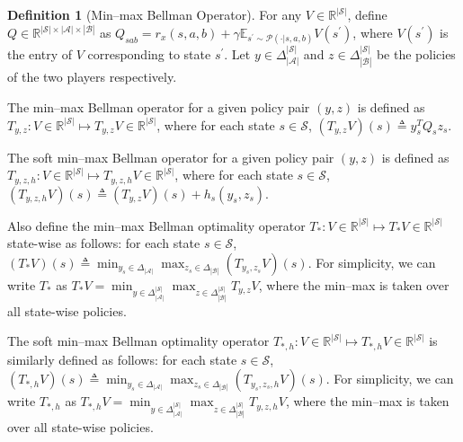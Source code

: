 \documentclass{article}
\theoremstyle{plain}
\theoremstyle{definition}
\newtheorem{definition}{Definition}
\theoremstyle{remark}
\def\R{\mathbb R}
\def\cA{\mathcal A}
\def\cB{\mathcal B}
\def\cP{\mathcal P}
\def\cS{\mathcal S}
\def\bydef{\triangleq}
\begin{document}
\begin{definition}[Min--max Bellman Operator]
    \label{definition: min-max-bellman-operator}
    For any $V \in \mathbb{R}^{|\mathcal{S}|}$, define $Q \in \mathbb{R}^{|\mathcal{S}| \times |\mathcal{A}| \times |\mathcal{B}|}$ as $Q_{sab} = r_x(s,a,b) + \gamma \mathbb{E}_{s^\prime \sim \cP(\cdot|s,a,b)} V(s^\prime)$, where $V(s^\prime)$ is the entry of $V$ corresponding to state $s^\prime$. Let $y \in \Delta^{|\cS|}_{|\cA|}$ and $z \in \Delta^{|\cS|}_{|\cB|}$ be the policies of the two players respectively.

    The min--max Bellman operator for a given policy pair $(y,z)$ is defined as
    $T_{y,z}: V \in \mathbb{R}^{|\mathcal{S}|} \mapsto T_{y,z} V \in \mathbb{R}^{|\mathcal{S}|}$,
    where for each state $s\in \mathcal{S}$,
    $(T_{y,z} V)(s) \bydef y_s^T Q_s z_s.$

    The soft min--max Bellman operator for a given policy pair $(y,z)$ is defined as
    $T_{y,z,h}: V \in \mathbb{R}^{|\mathcal{S}|} \mapsto  T_{y,z,h} V \in \mathbb{R}^{|\mathcal{S}|}$,
    where for each state $s\in \mathcal{S}$,
    $\left(T_{y,z,h} V\right)(s)  \bydef \left(T_{y,z} V\right)(s) + h_s(y_s,z_s).$

    Also define the min--max Bellman optimality operator $ T_{*}: V \in \mathbb{R}^{|\mathcal{S}|} \mapsto T_{*} V \in \R^{|\cS|}$ state-wise as follows: for each state $s\in \mathcal{S}$,
    $\left(T_{*} V\right)(s) \bydef \min_{y_s \in \Delta_{|\cA|}} \max_{z_s \in \Delta_{|\cB|}} \left(T_{y_s,z_s} V\right)(s).$ For simplicity, we can write $T_{*}$ as $T_{*} V = \min_{y \in \Delta_{|\cA|}^{|\cS|}} \max_{z \in \Delta_{|\cB|}^{|\cS|}} T_{y,z} V$, where the min--max is taken over all state-wise policies.

    The soft min--max Bellman optimality operator $T_{*,h}: V \in \mathbb{R}^{|\mathcal{S}|} \mapsto T_{*,h} V \in \mathbb{R}^{|\mathcal{S}|}$ is similarly defined as follows: for each state $s\in \mathcal{S}$, $\left(T_{*,h} V\right)(s) \bydef \min_{y_s \in \Delta_{|\cA|}} \max_{z_s \in \Delta_{|\cB|}} \left(T_{y_s,z_s,h} V\right)(s).$ For simplicity, we can write $T_{*,h}$ as $T_{*,h} V = \min_{y \in \Delta_{|\cA|}^{|\cS|}} \max_{z \in \Delta_{|\cB|}^{|\cS|}} T_{y,z,h} V$, where the min--max is taken over all state-wise policies.
\end{definition}
\end{document}
